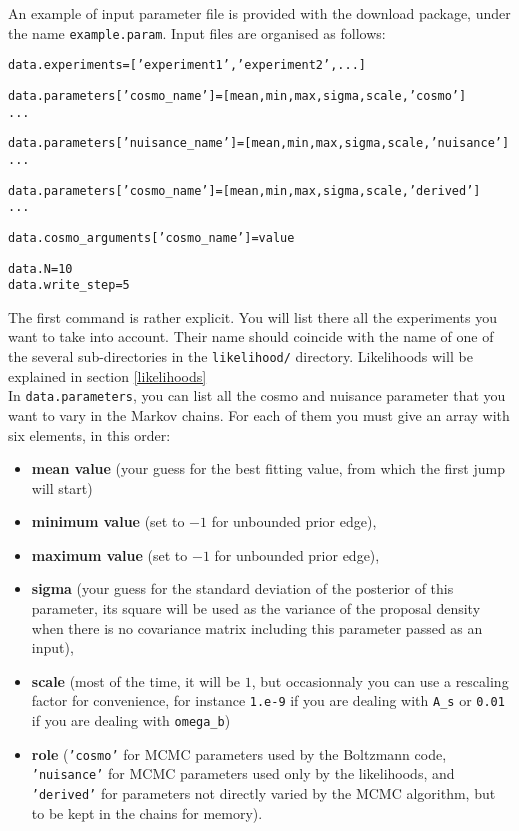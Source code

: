 \documentclass[10pt]{article}
\begin{document}
An example of input parameter file is provided with the download package, under the name \verb?example.param?. Input files are organised as follows:

  \begin{alltt}
    data.experiments = ['experiment1', 'experiment2', ...]
    
    data.parameters['cosmo_name']       = [mean, min, max, sigma, scale, 'cosmo']
    ...

    data.parameters['nuisance_name']    = [mean, min, max, sigma, scale, 'nuisance']
    ...

    data.parameters['cosmo_name']       = [mean, min, max, sigma, scale, 'derived']
    ...

    data.cosmo_arguments['cosmo_name']           = value

    data.N = 10
    data.write_step = 5
  \end{alltt}

  The first command is rather explicit. You will list there all the experiments
  you want to take into account. Their name should coincide with the name of one of the several sub-directories in the \verb?likelihood/? directory. Likelihoods will be explained in section \ref{likelihoods}\\

  In \verb?data.parameters?, you can list all the cosmo and nuisance parameter that you
  want to vary in the Markov chains. For each of them you must give an array
  with six elements, in this order: 
  \begin{itemize}
    \item {\bf mean value} (your guess for the best fitting value, from which the first jump will start)
    \item {\bf minimum value} (set to $-1$ for unbounded prior edge), 
    \item {\bf maximum value} (set to $-1$ for unbounded prior edge), 
    \item {\bf sigma} (your guess for the standard deviation of the posterior of this parameter, its square will be used as the variance of the proposal density when there is no covariance matrix including this parameter passed as an input),
    \item {\bf scale} (most of the time, it will be $1$, but occasionnaly you can use a rescaling factor for convenience, for instance {\tt 1.e-9} if you are dealing with \verb?A_s? or \verb?0.01? if you are dealing with \verb?omega_b?) 
    \item {\bf role} ({\tt 'cosmo'} for MCMC parameters used by the Boltzmann code, {\tt 'nuisance'} for MCMC parameters used only by the likelihoods, and {\tt 'derived'} for parameters not directly varied by the MCMC algorithm, but to be kept in the chains for memory).
      \end{itemize}
  
\end{document}
